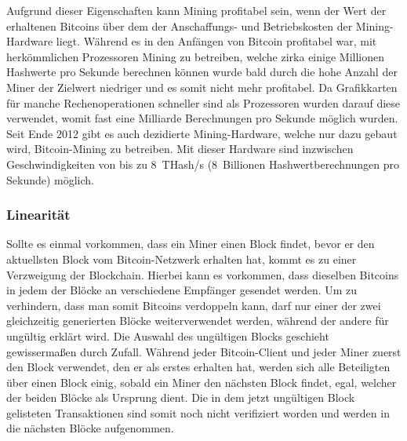 Aufgrund dieser Eigenschaften kann Mining profitabel sein, wenn der Wert der erhaltenen Bitcoins über dem der Anschaffungs- und Betriebskosten der Mining-Hardware liegt.
Während es in den Anfängen von Bitcoin profitabel war, mit herkömmlichen Prozessoren Mining zu betreiben, welche zirka einige Millionen Hashwerte pro Sekunde berechnen können wurde bald durch die hohe Anzahl der Miner der Zielwert niedriger und es somit nicht mehr profitabel.
Da Grafikkarten für manche Rechenoperationen schneller sind als Prozessoren wurden darauf diese verwendet, womit fast eine Milliarde Berechnungen pro Sekunde möglich wurden.
Seit Ende 2012 gibt es auch dezidierte Mining-Hardware, welche nur dazu gebaut wird, Bitcoin-Mining zu betreiben.
Mit dieser Hardware sind inzwischen Geschwindigkeiten von bis zu 8~THash/s (8~Billionen Hashwertberechnungen pro Sekunde) möglich.

\subsubsection{Linearität}

Sollte es einmal vorkommen, dass ein Miner einen Block findet, bevor er den aktuellsten Block vom Bitcoin-Netzwerk erhalten hat, kommt es zu einer Verzweigung der Blockchain.
Hierbei kann es vorkommen, dass dieselben Bitcoins in jedem der Blöcke an verschiedene Empfänger gesendet werden.
Um zu verhindern, dass man somit Bitcoins verdoppeln kann, darf nur einer der zwei gleichzeitig generierten Blöcke weiterverwendet werden, während der andere für ungültig erklärt wird.
Die Auswahl des ungültigen Blocks geschieht gewissermaßen durch Zufall.
Während jeder Bitcoin-Client und jeder Miner zuerst den Block verwendet, den er als erstes erhalten hat, werden sich alle Beteiligten über einen Block einig, sobald ein Miner den nächsten Block findet, egal, welcher der beiden Blöcke als Ursprung dient.
Die in dem jetzt ungültigen Block gelisteten Transaktionen sind somit noch nicht verifiziert worden und werden in die nächsten Blöcke aufgenommen.
